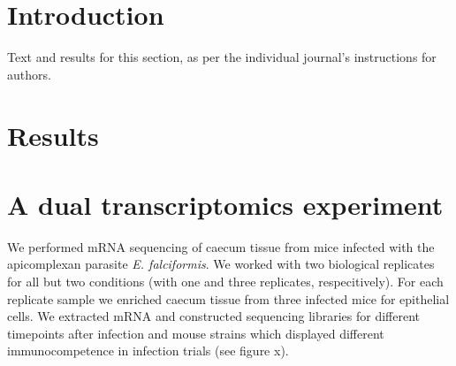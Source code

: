 \documentclass{bmcart}
\begin{document}



\section*{Introduction}
Text and results for this section, as per the individual journal's instructions for authors. 


  \section*{Results}


  \section*{A dual transcriptomics experiment}
We performed mRNA sequencing of caecum tissue from mice infected with
the apicomplexan parasite \textit{E. falciformis}. We worked with two
biological replicates for all but two conditions (with one and three
replicates, respecitively). For each replicate sample we enriched
caecum tissue from three infected mice for epithelial cells. We
extracted mRNA and constructed sequencing libraries for different
timepoints after infection and mouse strains which displayed different
immunocompetence in infection trials (see figure x).
\end{document}
